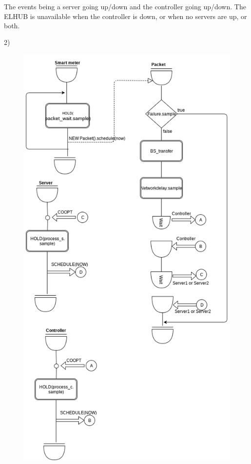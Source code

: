 \documentclass[11pt]{article}
\begin{document}
The events being a server going up/down and the controller going up/down.
The ELHUB is unavailable when the controller is down, or when no servers are up, or both.

2) 
\begin{figure}[H]
	\includegraphics[width=\textwidth]{activity-diagram2.png}
	\centering
\end{figure}
\end{document}
